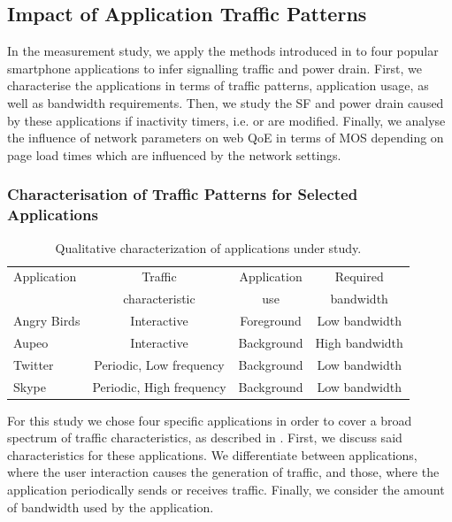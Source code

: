 \subsection{Impact of Application Traffic Patterns}\label{sec:network:network_traces:numerical_results}
In the measurement study, we apply the methods introduced in  to four popular smartphone
applications to infer signalling traffic and power drain.
First, we characterise the applications in terms of traffic patterns, application usage, as well as bandwidth requirements.
Then, we study the \gls{SF} and power drain caused by these applications if inactivity timers, i.e. \TDCH or \TFACH are modified.
Finally, we analyse the influence of network parameters on web \gls{QoE} in terms of \gls{MOS} depending on page load times which are influenced by the network settings.

\subsubsection*{Characterisation of Traffic Patterns for Selected Applications}\label{sec:network:network_traces:numerical_results:traffic_characterization}

\begin{table}
  \centering
  \caption{Qualitative characterization of applications under study.}
  \label{tab:network:network_traces:numerical_results:app_characterization}
  \begin{tabular}{lccc}
  	\toprule
    Application&Traffic&Application&Required\\
    &characteristic&use&bandwidth\\
    \midrule
    Angry Birds & Interactive & Foreground & Low bandwidth \\
    Aupeo & Interactive & Background & High bandwidth\\
    Twitter & Periodic, Low frequency & Background & Low bandwidth\\
    Skype & Periodic, High frequency& Background & Low bandwidth\\
    \bottomrule
  \end{tabular}
\end{table}

For this study we chose four specific applications in order to cover a broad spectrum of traffic characteristics, as described in .
First, we discuss said characteristics for these applications.
We differentiate between applications, where the user interaction causes the generation of traffic, and those, where the application periodically sends or receives traffic.
Finally, we consider the amount of bandwidth used by the application.

